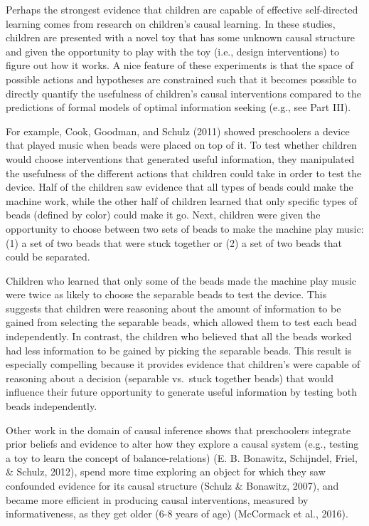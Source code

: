 \documentclass[english,floatsintext,man]{apa6}
\theoremstyle{definition}
\theoremstyle{definition}
\theoremstyle{definition}
\theoremstyle{remark}
\begin{document}
Perhaps the strongest evidence that children are capable of effective
self-directed learning comes from research on children's causal
learning. In these studies, children are presented with a novel toy that
has some unknown causal structure and given the opportunity to play with
the toy (i.e., design interventions) to figure out how it works. A nice
feature of these experiments is that the space of possible actions and
hypotheses are constrained such that it becomes possible to directly
quantify the usefulness of children's causal interventions compared to
the predictions of formal models of optimal information seeking (e.g.,
see Part III).

For example, Cook, Goodman, and Schulz (2011) showed preschoolers a
device that played music when beads were placed on top of it. To test
whether children would choose interventions that generated useful
information, they manipulated the usefulness of the different actions
that children could take in order to test the device. Half of the
children saw evidence that all types of beads could make the machine
work, while the other half of children learned that only specific types
of beads (defined by color) could make it go. Next, children were given
the opportunity to choose between two sets of beads to make the machine
play music: (1) a set of two beads that were stuck together or (2) a set
of two beads that could be separated.

Children who learned that only some of the beads made the machine play
music were twice as likely to choose the separable beads to test the
device. This suggests that children were reasoning about the amount of
information to be gained from selecting the separable beads, which
allowed them to test each bead independently. In contrast, the children
who believed that all the beads worked had less information to be gained
by picking the separable beads. This result is especially compelling
because it provides evidence that children's were capable of reasoning
about a decision (separable vs.~stuck together beads) that would
influence their future opportunity to generate useful information by
testing both beads independently.

Other work in the domain of causal inference shows that preschoolers
integrate prior beliefs and evidence to alter how they explore a causal
system (e.g., testing a toy to learn the concept of balance-relations)
(E. B. Bonawitz, Schijndel, Friel, \& Schulz, 2012), spend more time
exploring an object for which they saw confounded evidence for its
causal structure (Schulz \& Bonawitz, 2007), and became more efficient
in producing causal interventions, measured by informativeness, as they
get older (6-8 years of age) (McCormack et al., 2016).
\end{document}
